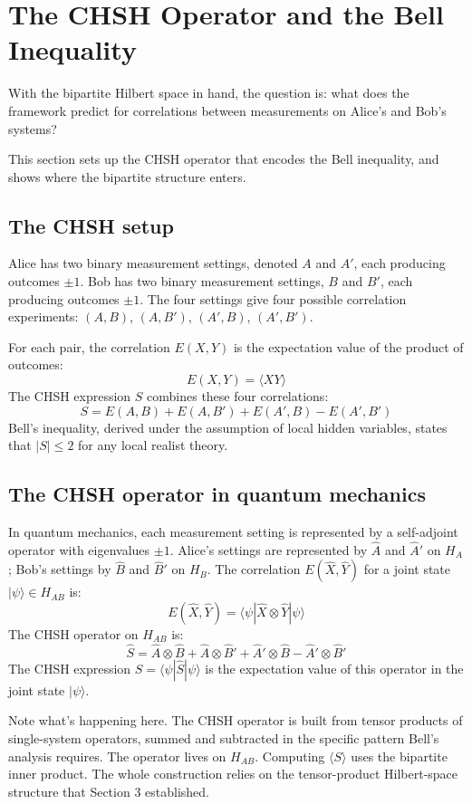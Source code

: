 \documentclass[11pt,a4paper]{article}
\begin{document}
\section{The CHSH Operator and the Bell Inequality}

With the bipartite Hilbert space in hand, the question is: what does the framework predict for correlations between measurements on Alice's and Bob's systems?

This section sets up the CHSH operator that encodes the Bell inequality, and shows where the bipartite structure enters.

\subsection{The CHSH setup}

Alice has two binary measurement settings, denoted $A$ and $A'$, each producing outcomes $\pm 1$. Bob has two binary measurement settings, $B$ and $B'$, each producing outcomes $\pm 1$. The four settings give four possible correlation experiments: $(A, B)$, $(A, B')$, $(A', B)$, $(A', B')$.

For each pair, the correlation $E(X, Y)$ is the expectation value of the product of outcomes:
\[
E(X, Y) = \langle XY \rangle
\]
The CHSH expression $S$ combines these four correlations:
\[
S = E(A, B) + E(A, B') + E(A', B) - E(A', B')
\]
Bell's inequality, derived under the assumption of local hidden variables, states that $|S| \leq 2$ for any local realist theory.

\subsection{The CHSH operator in quantum mechanics}

In quantum mechanics, each measurement setting is represented by a self-adjoint operator with eigenvalues $\pm 1$. Alice's settings are represented by $\hat{A}$ and $\hat{A}'$ on $H_A$; Bob's settings by $\hat{B}$ and $\hat{B}'$ on $H_B$. The correlation $E(\hat{X}, \hat{Y})$ for a joint state $|\psi\rangle \in H_{AB}$ is:
\[
E(\hat{X}, \hat{Y}) = \langle \psi | \hat{X} \otimes \hat{Y} | \psi \rangle
\]
The CHSH operator on $H_{AB}$ is:
\[
\hat{S} = \hat{A} \otimes \hat{B} + \hat{A} \otimes \hat{B}' + \hat{A}' \otimes \hat{B} - \hat{A}' \otimes \hat{B}'
\]
The CHSH expression $S = \langle\psi|\hat{S}|\psi\rangle$ is the expectation value of this operator in the joint state $|\psi\rangle$.

Note what's happening here. The CHSH operator is built from tensor products of single-system operators, summed and subtracted in the specific pattern Bell's analysis requires. The operator lives on $H_{AB}$. Computing $\langle S\rangle$ uses the bipartite inner product. The whole construction relies on the tensor-product Hilbert-space structure that Section 3 established.
\end{document}
